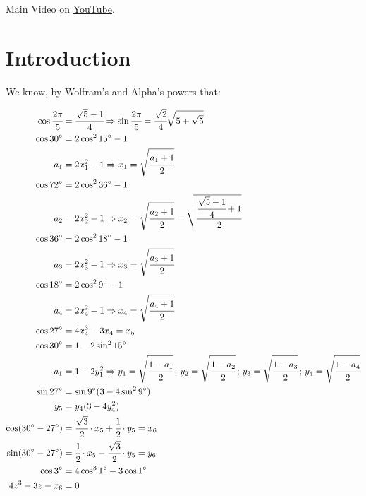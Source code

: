 \documentclass[11pt,a4paper]{article}
\begin{document}
Main Video on \href{https://www.youtube.com/watch?v=wio-6zjSsV4}{\color{blue}\underline{YouTube}}.

\section{Introduction}

We know, by Wolfram's and Alpha's powers that:

\begin{align}
\cos \cfrac{2 \pi}{5} &= \cfrac{\sqrt{5} - 1}{4} \Rightarrow \sin \cfrac{2 \pi}{5} = \cfrac{\sqrt{2}}{4} \sqrt{5 + \sqrt{5}} \\
\cos 30\degree &= 2 \cos^2 15\degree - 1 \\
a_1 &= 2 x_1^2 - 1 \Rightarrow x_1 = \sqrt{\cfrac{a_1 + 1}{2}} \\
\cos 72\degree &= 2 \cos^2 36\degree - 1 \\
a_2 &= 2 x_2^2 - 1 \Rightarrow x_2 = \sqrt{\cfrac{a_2 + 1}{2}} = \sqrt{\cfrac{\cfrac{\sqrt{5} - 1}{4} + 1}{2}} \\
\cos 36\degree &= 2 \cos^2 18\degree - 1 \\
a_3 &= 2 x_3^2 - 1 \Rightarrow x_3 = \sqrt{\cfrac{a_3 + 1}{2}} \\
\cos 18\degree &= 2 \cos^2 9\degree - 1 \\
a_4 &= 2 x_4^2 - 1 \Rightarrow x_4 = \sqrt{\cfrac{a_4 + 1}{2}} \\
\cos 27\degree &= 4 x_4^3 - 3 x_4 = x_5 \\
\cos 30\degree &= 1 - 2 \sin^2 15\degree \\
a_1 &= 1 - 2 y_1^2 \Rightarrow y_1 = \sqrt{\cfrac{1 - a_1}{2}}\,;\,y_2 = \sqrt{\cfrac{1 - a_2}{2}}\,;\,y_3 = \sqrt{\cfrac{1 - a_3}{2}}\,;\,y_4 = \sqrt{\cfrac{1 - a_4}{2}} \\
\sin 27\degree &= \sin 9\degree (3 - 4 \sin^2 9\degree) \\
y_5 &= y_4 (3 - 4 y_4^2) \\
\cos (30\degree - 27\degree) &= \cfrac{\sqrt{3}}{2} \cdot x_5 + \cfrac{1}{2} \cdot y_5 = x_6 \\
\sin (30\degree - 27\degree) &= \cfrac{1}{2} \cdot x_5 - \cfrac{\sqrt{3}}{2} \cdot y_5 = y_6 \\
\cos 3\degree &= 4 \cos^3 1\degree - 3 \cos 1\degree \\
4z^3 - 3z - x_6 &= 0
\end{align}

\vspace{3mm}
\end{document}
